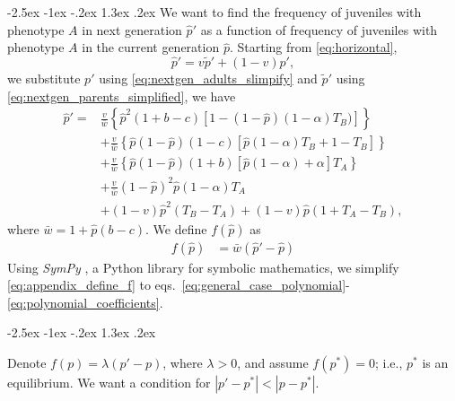 \documentclass[12pt]{extarticle}
\makeatletter
\renewcommand\section{\@startsection {section}{1}{\z@}%
     {-2.5ex \@plus -1ex \@minus -.2ex}%
     {1.3ex \@plus.2ex}%
    {\Large\bfseries}}
\makeatother
\begin{document}
{\begin{appendices}
\section{} \label{sec:appendixA}
We want to find the frequency of juveniles with phenotype $A$ in next generation $\hat{p}'$ as a function of frequency
of juveniles with phenotype $A$ in the current generation $\hat{p}$.
Starting from \autoref{eq:horizontal},
\begin{equation}\label{eq:appendix_b_1}
  \hat{p}' = v \tilde{p}' + (1-v) p',
\end{equation}
we substitute $p'$ using \autoref{eq:nextgen_adults_slimpify} and $\tilde{p}'$ using \autoref{eq:nextgen_parents_simplified}, we have
\begin{equation}\label{eq:appendix_b_2}
  \begin{aligned}
  \hat{p}'  = & \frac{v}{\bar{w}}\left\{\hat{p}^2(1+b-c)\left[1-(1-\hat{p})(1-\alpha)T_B)\right]\right\} \\
  & + \frac{v}{\bar{w}}\left\{ \hat{p}(1-\hat{p})(1-c)\left[ \hat{p}(1-\alpha)T_B + 1 - T_B \right] \right\} \\
  & + \frac{v}{\bar{w}}\left\{ \hat{p}(1-\hat{p})(1+b)\left[\hat{p}(1-\alpha) + \alpha \right]T_A \right\} \\
  & + \frac{v}{\bar{w}}(1-\hat{p})^2\hat{p}(1-\alpha)T_A \\
  & + (1-v)\hat{p}^2(T_B-T_A) + (1-v)\hat{p}(1+T_A-T_B),
\end{aligned}
\end{equation}
where $\bar{w} = 1 + \hat{p}(b-c)$. 
We define $f(\hat{p})$ as
\begin{equation} \label{eq:appendix_define_f}
\begin{aligned}
      f(\hat{p}) &= \bar{w}(\hat{p}' - \hat{p})
\end{aligned}
\end{equation}
Using \emph{SymPy} \citep{Meurer2017}, a Python library for symbolic mathematics, we simplify \autoref{eq:appendix_define_f} to 
eqs.~\ref{eq:general_case_polynomial}-\ref{eq:polynomial_coefficients}.

\section{} \label{sec:appendixB}

Denote $f(p)=\lambda(p'-p)$, where $\lambda>0$, and assume $f(p^*)=0$; i.e., $p^*$ is an equilibrium.
We want a condition for $|p'-p^*| < |p-p^*|$.


\end{appendices}}
\end{document}
